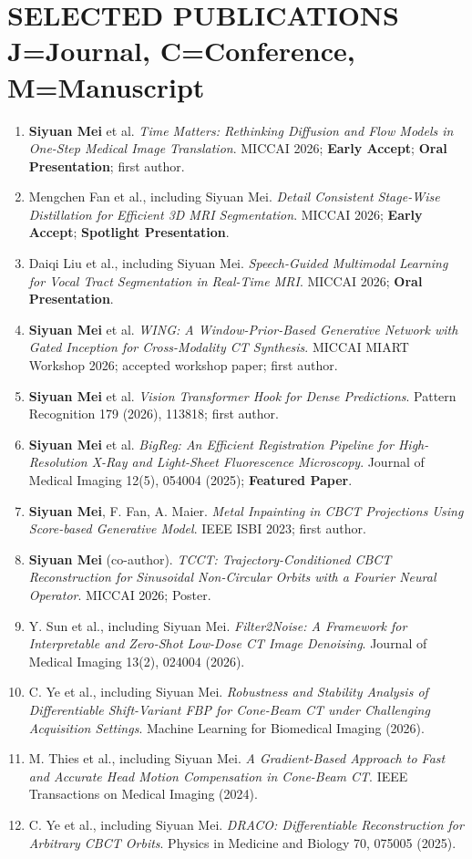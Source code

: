 \documentclass[10pt,a4paper]{article}
\newcommand{\pub}[4]{\item[\textbf{#1}] #2. \textit{#3}. #4.}
\newcommand{\tagline}[1]{\textcolor{highlightred}{\textbf{#1}}}
\begin{document}
\section[SELECTED PUBLICATIONS]{SELECTED PUBLICATIONS \hfill \textnormal{\textcolor{linkblue}{J=Journal, C=Conference, M=Manuscript}}}
\begin{enumerate}
    \pub{[C.1]}{\textbf{Siyuan Mei} et al}{Time Matters: Rethinking Diffusion and Flow Models in One-Step Medical Image Translation}{MICCAI 2026; \tagline{Early Accept}; \tagline{Oral Presentation}; first author}
    \pub{[C.2]}{Mengchen Fan et al., including Siyuan Mei}{Detail Consistent Stage-Wise Distillation for Efficient 3D MRI Segmentation}{MICCAI 2026; \tagline{Early Accept}; \tagline{Spotlight Presentation}}
    \pub{[C.3]}{Daiqi Liu et al., including Siyuan Mei}{Speech-Guided Multimodal Learning for Vocal Tract Segmentation in Real-Time MRI}{MICCAI 2026; \tagline{Oral Presentation}}
    \pub{[C.4]}{\textbf{Siyuan Mei} et al}{WING: A Window-Prior-Based Generative Network with Gated Inception for Cross-Modality CT Synthesis}{MICCAI MIART Workshop 2026; accepted workshop paper; first author}
    \pub{[J.1]}{\textbf{Siyuan Mei} et al}{Vision Transformer Hook for Dense Predictions}{Pattern Recognition 179 (2026), 113818; first author}
    \pub{[J.2]}{\textbf{Siyuan Mei} et al}{BigReg: An Efficient Registration Pipeline for High-Resolution X-Ray and Light-Sheet Fluorescence Microscopy}{Journal of Medical Imaging 12(5), 054004 (2025); \tagline{Featured Paper}}
    \pub{[C.5]}{\textbf{Siyuan Mei}, F. Fan, A. Maier}{Metal Inpainting in CBCT Projections Using Score-based Generative Model}{IEEE ISBI 2023; first author}
    \pub{[C.6]}{\textbf{Siyuan Mei} (co-author)}{TCCT: Trajectory-Conditioned CBCT Reconstruction for Sinusoidal Non-Circular Orbits with a Fourier Neural Operator}{MICCAI 2026; Poster}
    \pub{[J.3]}{Y. Sun et al., including Siyuan Mei}{Filter2Noise: A Framework for Interpretable and Zero-Shot Low-Dose CT Image Denoising}{Journal of Medical Imaging 13(2), 024004 (2026)}
    \pub{[J.4]}{C. Ye et al., including Siyuan Mei}{Robustness and Stability Analysis of Differentiable Shift-Variant FBP for Cone-Beam CT under Challenging Acquisition Settings}{Machine Learning for Biomedical Imaging (2026)}
    \pub{[J.5]}{M. Thies et al., including Siyuan Mei}{A Gradient-Based Approach to Fast and Accurate Head Motion Compensation in Cone-Beam CT}{IEEE Transactions on Medical Imaging (2024)}
    \pub{[J.6]}{C. Ye et al., including Siyuan Mei}{DRACO: Differentiable Reconstruction for Arbitrary CBCT Orbits}{Physics in Medicine and Biology 70, 075005 (2025)}

\end{enumerate}
\end{document}
